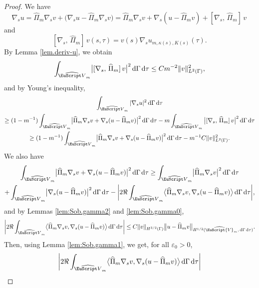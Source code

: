 \documentclass[JEP,XML,SOM,Unicode]{cedram}
\let\mathcal \EuScript
\newcommand{\cV}{\mathcal{V}}
\theoremstyle{plain}
\theoremstyle{definition}
\newcommand{\dx}{\mathrm{\,d}}
\begin{document}
\begin{proof}
We have
\[
\nabla_s u
= \widehat{\Pi}_m \nabla_s v + \bigl(\nabla_s u - \widehat{\Pi}_m \nabla_s v\bigr)
=
\widehat{\Pi}_m \nabla_s v + \nabla_s (u-\widehat{\Pi}_m v) +[ \nabla_s,\,\widehat{\Pi}_m ]\,v\,
\]
and
\[
[ \nabla_s,\,\widehat{\Pi}_m ]\,v(s,\tau) = v(s)\nabla_s u_{m,\kappa(s),K(s)}(\tau).
\]
By Lemma \ref{lem.deriv-u}, we obtain
\[
\int_{\widehat{\mathcal V}_{m}}\bigl|[ \nabla_s,\,\widehat{\Pi}_m ]\,v\bigr|^2\dx \Gamma \dx\tau \leq Cm^{-2}\|v\|^2_{L^2(\Gamma)},
\]
and by Young's inequality,
\begin{multline}\label{eq:lemboundext7}
\int_{\widehat{\mathcal V}_{m}}|\nabla_s u|^2 \dx \Gamma \dx\tau
\\\geq
(1-m^{-1})\int_{\widehat{\mathcal V}_{m}}\bigl|\widehat{\Pi}_m \nabla_s v + \nabla_s (u-\widehat{\Pi}_m v)\bigl|^2 \dx \Gamma \dx\tau
-m
\int_{\widehat{\mathcal V}_{m}}\big|[ \nabla_s,\,\widehat{\Pi}_m ]\,v\big|^2 \dx \Gamma \dx\tau
\\\geq
(1-m^{-1})\int_{\widehat{\mathcal V}_{m}}\bigl|\widehat{\Pi}_m \nabla_s v + \nabla_s (u-\widehat{\Pi}_m v)\bigr|^2 \dx \Gamma \dx\tau
-m^{-1}C\|v\|^2_{L^2(\Gamma)}.
\end{multline}
We also have
\begin{multline}\label{eq:lemboundext2}
\int_{\widehat{\mathcal V}_{m}}\bigl|\widehat{\Pi}_m \nabla_s v + \nabla_s (u-\widehat{\Pi}_m v)\bigr|^2 \dx \Gamma \dx\tau
\geq
\int_{\widehat{\mathcal V}_{m}}\bigl|\widehat{\Pi}_m \nabla_s v \bigr|^2 \dx \Gamma \dx\tau
\\
+
\int_{\widehat{\mathcal V}_{m}}\bigl|\nabla_s (u-\widehat{\Pi}_m v)\bigr|^2 \dx \Gamma \dx\tau
-
\biggl|2\Re
\int_{\widehat{\mathcal V}_{m}}\bigl\langle\widehat{\Pi}_m \nabla_s v, \nabla_s (u-\widehat{\Pi}_m v)\bigr\rangle \dx \Gamma \dx\tau\biggr|,
\end{multline}
and
by Lemmas \ref{lem:Sob.gamma2} and \ref{lem:Sob.gamma0},
\begin{equation*}
\biggl|2\Re
\int_{\widehat{\mathcal V}_{m}}\bigl\langle\widehat{\Pi}_m \nabla_s v, \nabla_s (u-\widehat{\Pi}_m v)\bigr\rangle \dx \Gamma \dx\tau\biggr|
\leq C
\|v\|_{H^{3/2}(\Gamma)}
\bigl\|u - \widehat{\Pi}_mv\bigr\|_{H^{1/2}(\widehat{\cV}_m, \dx\Gamma\dx\tau)}.
\end{equation*}
Then, using Lemma \ref{lem:Sob.gamma1}, we get, for all $\varepsilon_0>0$,
\begin{equation}\label{eq:lemboundext3}
\begin{split}
\biggl|2\Re
\int_{\widehat{\mathcal V}_{m}}\bigl\langle&\widehat{\Pi}_m \nabla_s v, \nabla_s (u-\widehat{\Pi}_m v)\bigr\rangle \dx \Gamma \dx\tau\biggr|\\

\end{split}
\end{equation}
\end{proof}
\end{document}
